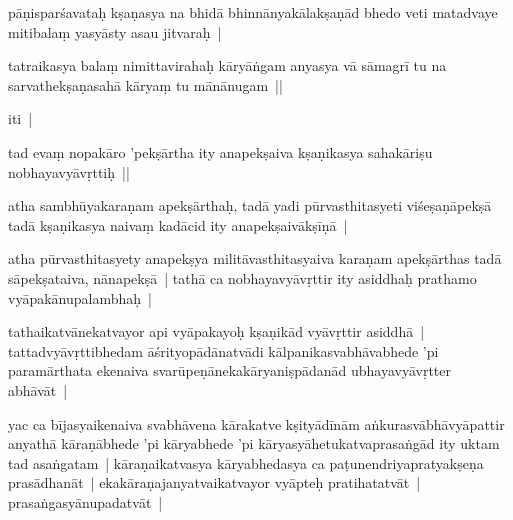 \documentclass[article,12pt,a4paper]{memoir}%
\newcounter{parCount}
\begin{document}
	  \pstart \leavevmode%
	pāṇisparśavataḥ kṣaṇasya na bhidā bhinnānyakālakṣaṇād bhedo veti matadvaye mitibalaṃ yasyāsty asau jitvaraḥ |
	{}
	\pend%
      

	  \pstart \leavevmode%
	tatraikasya balaṃ nimittavirahaḥ kāryāṅgam anyasya vā sāmagrī tu na sarvathekṣaṇasahā kāryaṃ tu mānānugam || 
	{}
	\pend%
      

	  \pstart \leavevmode%
	iti |
	{}
	\pend%
      

	  \pstart \leavevmode%
	\label{thakur75-81.14}tad evaṃ nopakāro 'pekṣārtha ity anapekṣaiva kṣaṇikasya sahakāriṣu nobhayavyāvṛttiḥ ||
	{}
	\pend%
      

	  \pstart \leavevmode%
	\label{thakur75-81.15}atha sambhūyakaraṇam apekṣārthaḥ, tadā yadi pūrvasthitasyeti viśeṣaṇāpekṣā tadā kṣaṇikasya naivaṃ kadācid ity anapekṣaivākṣīṇā |
	{}
	\pend%
      

	  \pstart \leavevmode%
	\label{thakur75-81.17}atha pūrvasthitasyety anapekṣya militāvasthitasyaiva karaṇam apekṣārthas tadā sāpekṣataiva, nānapekṣā | tathā ca nobhayavyāvṛttir ity asiddhaḥ prathamo vyāpakānupalambhaḥ | 
	{}
	\pend%
      

	  \pstart \leavevmode%
	\label{thakur75-81.19}tathaikatvānekatvayor api vyāpakayoḥ kṣaṇikād vyāvṛttir asiddhā | tattadvyāvṛttibhedam āśrityopādānatvādi kālpanikasvabhāvabhede 'pi paramārthata ekenaiva svarūpeṇānekakāryaniṣpādanād ubhayavyāvṛtter abhāvāt |
	{}
	\pend%
      

	  \pstart \leavevmode%
	\label{thakur75-81.22}yac ca bījasyaikenaiva svabhāvena kārakatve kṣityādīnām aṅkurasvābhāvyāpattir anyathā kāraṇābhede 'pi kāryabhede 'pi kāryasyāhetukatvaprasaṅgād ity uktam tad asaṅgatam | kāraṇaikatvasya kāryabhedasya ca paṭunendriyapratyakṣeṇa prasādhanāt | ekakāraṇajanyatvaikatvayor vyāpteḥ pratihatatvāt | prasaṅgasyānupadatvāt |
	{}
	\pend%
      
\end{document}
